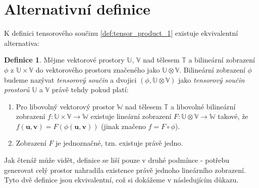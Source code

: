 \documentclass[a5paper,12pt]{amsbook}
\theoremstyle{definition}
\newtheorem{definition}{Definice}[chapter]
\newcommand{\myvec}[1]{\bm{#1}}
\newcommand{\myspace}[1]{\mathbb{#1}}
\begin{document}
\section{Alternativní definice}

\noindent
K definici tensorového součinu \ref{def:tensor_product_1} existuje ekvivalentní alternativa:
\begin{definition}
\label{def:tensor_product_2}
Mějme vektorové prostory $\myspace{U}$, $\myspace{V}$ nad tělesem $\myspace{T}$ a bilineární zobrazení
$\phi$ z $\myspace{U}\times\myspace{V}$ do vektorového prostoru značeného jako
$\myspace{U}\otimes\myspace{V}$. Bilineární zobrazení $\phi$ budeme nazývat \textit{tensorový součin}
a dvojici $(\phi, \myspace{U}\otimes\myspace{V})$ jako \textit{tensorový součin prostorů} $\myspace{U}$
a $\myspace{V}$ právě tehdy pokud platí:
\begin{enumerate}	
\item Pro libovolný vektorový prostor $\myspace{W}$ nad tělesem $\myspace{T}$ a libovolné bilineární
	zobrazení $f: \myspace{U}\times\myspace{V}\rightarrow\myspace{W}$ existuje lineární zobrazení
	$F: \myspace{U}\otimes\myspace{V}\rightarrow\myspace{W}$ takové, že $f(\myvec{u}, \myvec{v})
	= F(\phi(\myvec{u}, \myvec{v}))$ (jinak značeno $f = F \circ \phi$).
\item Zobrazení $F$ je jednoznačné, tzn. existuje právě jedno.
\end{enumerate}
\end{definition}
Jak čtenář může vidět, definice se liší pouze v druhé podmínce - potřebu generovat celý prostor
nahradila existence právě jednoho lineárního zobrazení. Tyto dvě definice jsou ekvivalentní, což
si dokážeme v následujícím důkazu.
\end{document}
